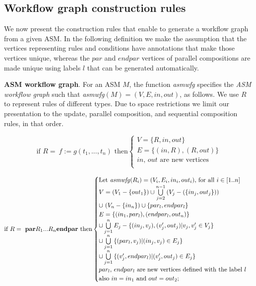 \subsection{Workflow graph construction rules}

We now present the construction rules that enable to generate a workflow graph from a given ASM. In the following definition we make the assumption that the vertices representing rules and conditions have annotations that make those vertices unique, whereas the $par$ and $endpar$ vertices of parallel compositions are made unique using labels $l$ that can be generated automatically.

\vspace*{0.25cm}
\noindent \textbf{ASM workflow graph}. For an ASM $M$, the function \textit{asmwfg} specifies the \textit{ASM workflow graph} such that \textit{asmwfg}$(M) = (V, E, in, out)$, as follows. We use $R$ to represent rules of different types. Due to space restrictions we limit our presentation to the update, parallel composition, and sequential composition rules, in that order.

\begin{equation*}
	\text{if $R = \ f := g(t_1,...,t_n)$ then}
	\begin{cases}
			\text{$V = \{R, in, out\}$}\\
			\text{$E = \{(in, R), (R, out)\}$}\\
			\text{$in$, $out$ are new vertices}\\
	\end{cases}
\end{equation*}

\begin{equation*}
	\text{if $R = \ \textbf{par} R_1 ... R_n \textbf{endpar}$ then}
	\begin{cases}
			\text{Let \textit{asmwfg}$(R_i) = (V_i, E_i, in_i, out_i)$, for all $i \in [1..n]$}\\
			\text{$V = (V_1 - \{out_1\}) \cup \bigcup \limits_{j=2}^{n-1}{(V_j - (\{in_j, out_j\}))}$}\\
			\text{$\cup \ (V_n - \{in_n\}) \cup  \{par_l, endpar_l\}$}\\
			\text{$E = \{(in_1, par_l), (endpar_l, out_n)\}$}\\
			\text{$\cup \bigcup \limits_{j=1}^{n}{E_j - \{(in_j, v_j), (v_j', out_j) | v_j, v_j' \in V_j\}} $}\\
			\text{$\cup \bigcup \limits_{j=1}^{n}{\{(par_l, v_j) | (in_j, v_j) \in E_j\}} $}\\
			\text{$\cup \bigcup \limits_{j=1}^{n}{\{(v_j', endpar_l) | (v_j', out_j) \in E_j\}} $}\\
			\text{$par_l$, $endpar_l$ are new vertices defined with the label $l$}\\
			\text{also $in = in_1$ and $out = out_2$;}\\
	\end{cases}
\end{equation*}

